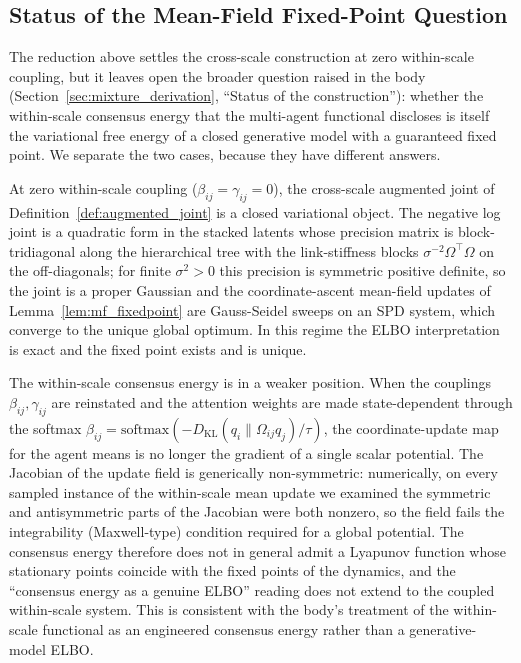 \documentclass[11pt]{article}
\begin{document}
\subsection{Status of the Mean-Field Fixed-Point Question}
\label{app:mf_fixedpoint_status}

The reduction above settles the cross-scale construction at zero within-scale coupling, but it leaves open the broader question raised in the body (Section~\ref{sec:mixture_derivation}, ``Status of the construction''): whether the within-scale consensus energy that the multi-agent functional discloses is itself the variational free energy of a closed generative model with a guaranteed fixed point. We separate the two cases, because they have different answers.

At zero within-scale coupling ($\beta_{ij} = \gamma_{ij} = 0$), the cross-scale augmented joint of Definition~\ref{def:augmented_joint} is a closed variational object. The negative log joint is a quadratic form in the stacked latents whose precision matrix is block-tridiagonal along the hierarchical tree with the link-stiffness blocks $\sigma^{-2}\Omega^\top\Omega$ on the off-diagonals; for finite $\sigma^2 > 0$ this precision is symmetric positive definite, so the joint is a proper Gaussian and the coordinate-ascent mean-field updates of Lemma~\ref{lem:mf_fixedpoint} are Gauss-Seidel sweeps on an SPD system, which converge to the unique global optimum. In this regime the ELBO interpretation is exact and the fixed point exists and is unique.

The within-scale consensus energy is in a weaker position. When the couplings $\beta_{ij}, \gamma_{ij}$ are reinstated and the attention weights are made state-dependent through the softmax $\beta_{ij} = \mathrm{softmax}(-D_{\mathrm{KL}}(q_i\|\Omega_{ij}q_j)/\tau)$, the coordinate-update map for the agent means is no longer the gradient of a single scalar potential. The Jacobian of the update field is generically non-symmetric: numerically, on every sampled instance of the within-scale mean update we examined the symmetric and antisymmetric parts of the Jacobian were both nonzero, so the field fails the integrability (Maxwell-type) condition required for a global potential. The consensus energy therefore does not in general admit a Lyapunov function whose stationary points coincide with the fixed points of the dynamics, and the ``consensus energy as a genuine ELBO'' reading does not extend to the coupled within-scale system. This is consistent with the body's treatment of the within-scale functional as an engineered consensus energy rather than a generative-model ELBO.
\end{document}
